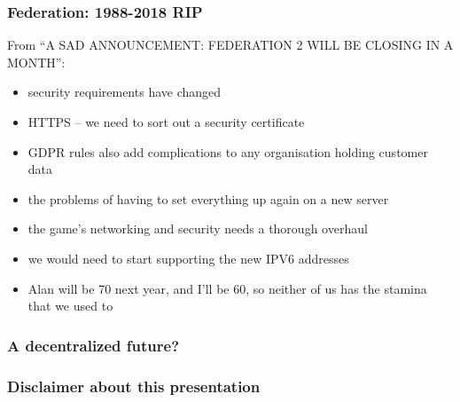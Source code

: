 \documentclass[aspectratio=169]{beamer}
\begin{document}
\begin{frame}
\frametitle{Federation: 1988-2018 RIP}
From ``A SAD ANNOUNCEMENT: FEDERATION 2 WILL BE CLOSING IN A MONTH'':
  \begin{itemize}
    \item{} security requirements have changed
    \item{} HTTPS -- we need to sort out a security certificate
    \item{} GDPR rules also add complications to any organisation holding customer data
    \item{} the problems of having to set everything up again on a new server
    \item{} the game’s networking and security needs a thorough overhaul
    \item{} we would need to start supporting the new IPV6 addresses
    \item{} Alan will be 70 next year, and I’ll be 60, so neither of us has the stamina that we used to
  \end{itemize}
\end{frame}

\begin{frame}
\frametitle{A decentralized future?}
\end{frame}

\begin{frame}
\frametitle{Disclaimer about this presentation}
\end{frame}

\subtitle{Thank you}
\frame[plain]{\titlepage}
\end{document}
